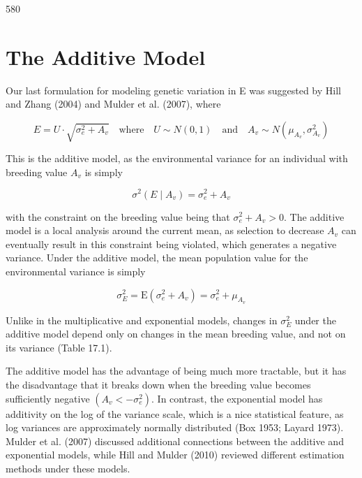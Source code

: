 \documentclass{article}
\begin{document}
580

\section{The Additive Model}
Our last formulation for modeling genetic variation in E was suggested by Hill and Zhang (2004) and Mulder et al. (2007), where

\begin{equation}
E=U\cdot\sqrt{\sigma_{e}^{2}+A_{v}}\quad\mathrm{w h e r e}\quad U\sim N(0,1)\quad\mathrm{a n d}\quad A_{v}\sim N(\mu_{A_{v}},\sigma_{A_{v}}^{2})
\tag{17.4a}
\label{eq:17_4a}
\end{equation}

This is the additive model, as the environmental variance for an individual with breeding value  $ A_{v} $ is simply

\begin{equation}
\sigma^{2}(E\mid A_{v})=\sigma_{e}^{2}+A_{v}
\tag{17.4b}
\label{eq:17_4b}
\end{equation}

with the constraint on the breeding value being that  $ \sigma_e^2 + A_v > 0 $. The additive model is a local analysis around the current mean, as selection to decrease  $ A_v $ can eventually result in this constraint being violated, which generates a negative variance. Under the additive model, the mean population value for the environmental variance is simply

\begin{equation}
\sigma_{E}^{2}=\mathrm{E}\left(\sigma_{e}^{2}+A_{v}\right)=\sigma_{e}^{2}+\mu_{A_{v}}
\tag{17.4c}
\label{eq:17_4c}
\end{equation}

Unlike in the multiplicative and exponential models, changes in  $ \sigma_{E}^{2} $ under the additive model depend only on changes in the mean breeding value, and not on its variance (Table 17.1).

The additive model has the advantage of being much more tractable, but it has the disadvantage that it breaks down when the breeding value becomes sufficiently negative  $ (A_v < -\sigma_e^2) $. In contrast, the exponential model has additivity on the log of the variance scale, which is a nice statistical feature, as log variances are approximately normally distributed (Box 1953; Layard 1973). Mulder et al. (2007) discussed additional connections between the additive and exponential models, while Hill and Mulder (2010) reviewed different estimation methods under these models.
\end{document}
